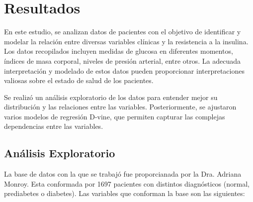 \chapter{Resultados}\label{Resultados}

En este estudio, se analizan datos de pacientes con el objetivo de identificar y modelar la relación entre diversas variables clínicas y la resistencia a la insulina. Los datos recopilados incluyen medidas de glucosa en diferentes momentos, índices de masa corporal, niveles de presión arterial, entre otros. La adecuada interpretación y modelado de estos datos pueden proporcionar interpretaciones valiosas sobre el estado de salud de los pacientes. 

Se realizó un análisis exploratorio de los datos para entender mejor su distribución y las relaciones entre las variables. Posteriormente, se ajustaron varios modelos de regresión D-vine, que permiten capturar las complejas dependencias entre las variables. 

\section{Análisis Exploratorio}

La base de datos con la que se trabajó fue proporcianada por la Dra. Adriana Monroy. Esta conformada por 1697 pacientes con distintos diagnósticos (normal, prediabetes o diabetes). Las variables que conforman la base son las siguientes:

